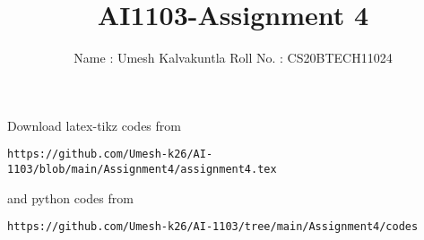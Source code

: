 \documentclass[journal,12pt,twocolumn]{IEEEtran}
\DeclareMathOperator*{\Res}{Res}
\begin{document}
\newcommand{\BEQA}{\begin{eqnarray}}
\newcommand{\EEQA}{\end{eqnarray}}
\newcommand{\define}{\stackrel{\triangle}{=}}

\raggedbottom
\setlength{\parindent}{0pt}
\providecommand{\mbf}{\mathbf}
\providecommand{\pr}[1]{\ensuremath{\Pr\left(#1\right)}}
\providecommand{\qfunc}[1]{\ensuremath{Q\left(#1\right)}}
\providecommand{\sbrak}[1]{\ensuremath{{}\left[#1\right]}}
\providecommand{\lsbrak}[1]{\ensuremath{{}\left[#1\right.}}
\providecommand{\rsbrak}[1]{\ensuremath{{}\left.#1\right]}}
\providecommand{\brak}[1]{\ensuremath{\left(#1\right)}}
\providecommand{\lbrak}[1]{\ensuremath{\left(#1\right.}}
\providecommand{\rbrak}[1]{\ensuremath{\left.#1\right)}}
\providecommand{\cbrak}[1]{\ensuremath{\left\{#1\right\}}}
\providecommand{\lcbrak}[1]{\ensuremath{\left\{#1\right.}}
\providecommand{\rcbrak}[1]{\ensuremath{\left.#1\right\}}}
\theoremstyle{remark}
\newtheorem{rem}{Remark}
\newcommand{\sgn}{\mathop{\mathrm{sgn}}}
\providecommand{\abs}[1]{\vert#1\vert}
\providecommand{\res}[1]{\Res\displaylimits_{#1}} 
\providecommand{\norm}[1]{\lVert#1\rVert}
\providecommand{\mtx}[1]{\mathbf{#1}}
\providecommand{\mean}[1]{E[ #1 ]}
\providecommand{\fourier}{\overset{\mathcal{F}}{ \rightleftharpoons}}
\providecommand{\system}{\overset{\mathcal{H}}{ \longleftrightarrow}}
\newcommand{\solution}{\noindent \textbf{Solution: }}
\newcommand{\cosec}{\,\text{cosec}\,}
\providecommand{\dec}[2]{\ensuremath{\overset{#1}{\underset{#2}{\gtrless}}}}
\newcommand{\myvec}[1]{\ensuremath{\begin{pmatrix}#1\end{pmatrix}}}
\newcommand{\mydet}[1]{\ensuremath{\begin{vmatrix}#1\end{vmatrix}}}
\makeatletter
{}
\makeatother
\let\StandardTheFigure\thefigure
\let\vec\mathbf
\renewcommand{\thefigure}{\theproblem}
\def\putbox#1#2#3{\makebox[0in][l]{\makebox[#1][l]{}\raisebox{\baselineskip}[0in][0in]{\raisebox{#2}[0in][0in]{#3}}}}
     \def\rightbox#1{\makebox[0in][r]{#1}}
     \def\centbox#1{\makebox[0in]{#1}}
     \def\topbox#1{\raisebox{-\baselineskip}[0in][0in]{#1}}
     \def\midbox#1{\raisebox{-0.5\baselineskip}[0in][0in]{#1}}
\vspace{3cm}
\title{AI1103-Assignment 4}
\author{Name : Umesh Kalvakuntla     Roll No. : CS20BTECH11024}
\maketitle
\newpage
\bigskip
\renewcommand{\thefigure}{\theenumi}
\renewcommand{\thetable}{\theenumi}
Download latex-tikz codes from 
%
\begin{lstlisting}
https://github.com/Umesh-k26/AI-1103/blob/main/Assignment4/assignment4.tex
\end{lstlisting}
and python codes from 
\begin{lstlisting}
https://github.com/Umesh-k26/AI-1103/tree/main/Assignment4/codes
\end{lstlisting}
\end{document}
